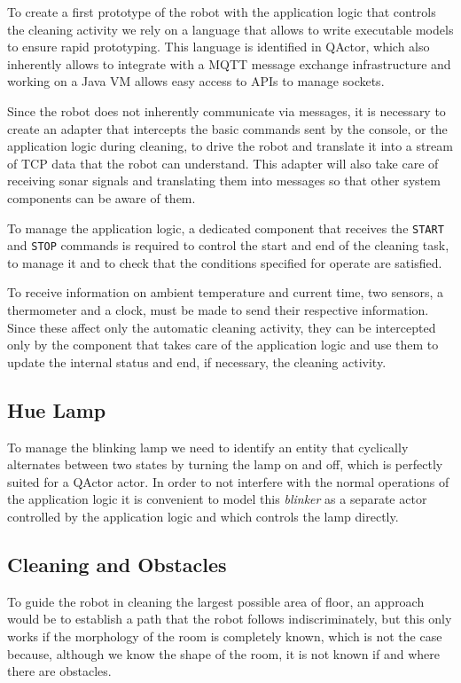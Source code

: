 To create a first prototype of the robot with the application logic that controls the cleaning activity we rely on a language that allows to write executable models to ensure rapid prototyping. This language is identified in QActor, which also inherently allows to integrate with a MQTT message exchange infrastructure and working on a Java VM allows easy access to APIs to manage sockets.

Since the robot does not inherently communicate via messages, it is necessary to create an adapter that intercepts the basic commands sent by the console, or the application logic during cleaning, to drive the robot and translate it into a stream of TCP data that the robot can understand. This adapter will also take care of receiving sonar signals and translating them into messages so that other system components can be aware of them.

To manage the application logic, a dedicated component that receives the \texttt{START} and \texttt{STOP} commands is required to control the start and end of the cleaning task, to manage it and to check that the conditions specified for operate are satisfied.

To receive information on ambient temperature and current time, two sensors, a thermometer and a clock, must be made to send their respective information. Since these affect only the automatic cleaning activity, they can be intercepted only by the component that takes care of the application logic and use them to update the internal status and end, if necessary, the cleaning activity.

\subsection{Hue Lamp}
To manage the blinking lamp we need to identify an entity that cyclically alternates between two states by turning the lamp on and off, which is perfectly suited for a QActor actor. In order to not interfere with the normal operations of the application logic it is convenient to model this \textit{blinker} as a separate actor controlled by the application logic and which controls the lamp directly.

\subsection{Cleaning and Obstacles}
To guide the robot in cleaning the largest possible area of floor, an approach would be to establish a path that the robot follows indiscriminately, but this only works if the morphology of the room is completely known, which is not the case because, although we know the shape of the room, it is not known if and where there are obstacles.

